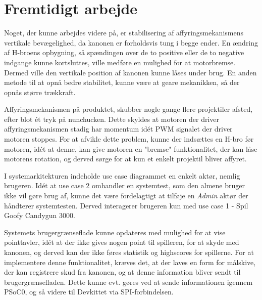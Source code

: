 \chapter{Fremtidigt arbejde}


Noget, der kunne arbejdes videre på, er stabilisering af affyringsmekanismens vertikale bevægelighed, da kanonen er forholdsvis tung i begge ender. En ændring af H-broens opbygning, så spændingen over de to positive eller de to negative indgange kunne kortsluttes, ville medføre en mulighed for at motorbremse. Dermed ville den vertikale position af kanonen kunne låses under brug. En anden metode til at opnå bedre stabilitet, kunne være at geare mekanikken, så der opnås større trækkraft.\newline

\noindent Affyringsmekanismen på produktet, skubber nogle gange flere projektiler afsted, efter blot ét tryk på nunchucken. Dette skyldes at motoren der driver affyringsmekanismen stadig har momentum idét PWM signalet der driver motoren stoppes. For at afvikle dette problem, kunne der indsættes en H-bro før motoren, idét at denne, kan give motoren en "bremse" funktionalitet, der kan låse motorens rotation, og derved sørge for at kun et enkelt projektil bliver affyret. \newline 

\noindent I systemarkitekturen indeholde use case diagrammet en enkelt aktør, nemlig brugeren. Idét at use case 2 omhandler en systemtest, som den almene bruger ikke vil gøre brug af, kunne det være fordelagtigt at tilføje en \textit{Admin} aktør der håndterer systemtesten. Derved interagerer brugeren kun med use case 1 - Spil Goofy Candygun 3000. \newline

\noindent Systemets brugergrænseflade kunne opdateres med mulighed for at vise pointtavler, idét at der ikke gives nogen point til spilleren, for at skyde med kanonen, og derved kan der ikke føres statistik og highscores for spillerne. For at implementere denne funktionalitet, kræves det, at der laves en form for målskive, der kan registrere skud fra kanonen, og at denne information bliver sendt til brugergrænsefladen. Dette kunne evt. gøres ved at sende informationen igennem PSoC0, og så videre til Devkittet via SPI-forbindelsen. \newline

